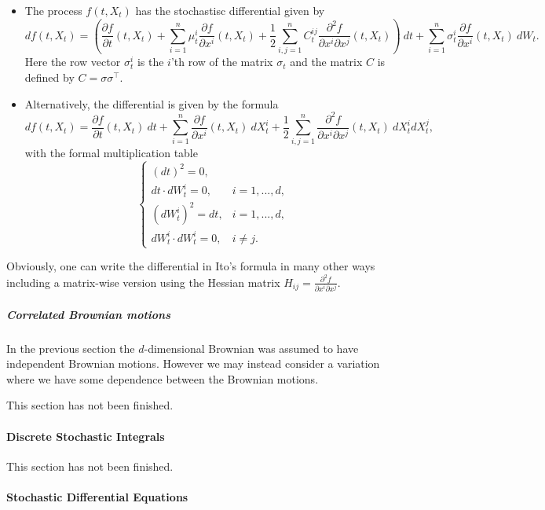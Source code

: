 \documentclass[
]{article}
\providecommand{\tightlist}{%
  \setlength{\itemsep}{0pt}\setlength{\parskip}{0pt}}
\begin{document}
\begin{itemize}
\tightlist
\item
  The process \(f(t,X_t)\) has the stochastisc differential given by \[
    df(t,X_t)=\left(\frac{\partial f}{\partial t}(t,X_t) + \sum_{i=1}^n\mu^i_t\frac{\partial f}{\partial x^i}(t,X_t) + \frac{1}{2}\sum_{i,j=1}^nC_t^{ij}\frac{\partial^2 f}{\partial x^i\partial x^j}(t,X_t)\right)\ dt+\sum_{i=1}^n\sigma^i_t\frac{\partial f}{\partial x^i}(t,X_t)\ dW_t.
    \] Here the row vector \(\sigma^i_t\) is the \(i\)'th row of the
  matrix \(\sigma_t\) and the matrix \(C\) is defined by
  \(C=\sigma\sigma^\top\).
\item
  Alternatively, the differential is given by the formula \[
    df(t,X_t)=\frac{\partial f}{\partial t}(t,X_t)\ dt + \sum_{i=1}^n\frac{\partial f}{\partial x^i}(t,X_t)\ dX^i_t + \frac{1}{2}\sum_{i,j=1}^n\frac{\partial^2 f}{\partial x^i\partial x^j}(t,X_t)\ dX^i_tdX^j_t,
    \] with the formal multiplication table \[
    \left\{\begin{matrix}(dt)^2=0,\\  dt\cdot dW_t^i=0, & i = 1,...,d,\\ (dW_t^i)^2=dt, & i=1,...,d, \\ dW_t^i\cdot dW_t^i =0, & i\ne j.\end{matrix}\right.
    \]
\end{itemize}

Obviously, one can write the differential in Ito's formula in many other
ways including a matrix-wise version using the Hessian matrix
\(H_{ij}=\frac{\partial^2 f}{\partial x^i\partial x^j}\).

\hypertarget{correlated-brownian-motions}{%
\subparagraph{Correlated Brownian
motions}\label{correlated-brownian-motions}}

In the previous section the \(d\)-dimensional Brownian was assumed to
have independent Brownian motions. However we may instead consider a
variation where we have some dependence between the Brownian motions.

This section has not been finished.

\hypertarget{discrete-stochastic-integrals}{%
\paragraph{Discrete Stochastic
Integrals}\label{discrete-stochastic-integrals}}

This section has not been finished.

\hypertarget{stochastic-differential-equations}{%
\paragraph{Stochastic Differential
Equations}\label{stochastic-differential-equations}}
\end{document}
